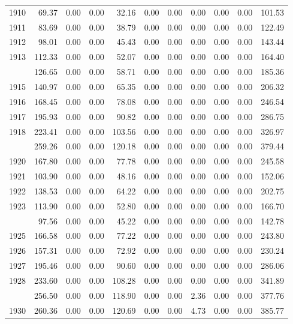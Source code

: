 \begin{longtable}[t]{rrrrrrrrrrr}
1910 & 69.37 & 0.00 & 0.00 & 32.16 & 0.00 & 0.00 & 0.00 & 0.00 & 0.00 & 101.53\\
1911 & 83.69 & 0.00 & 0.00 & 38.79 & 0.00 & 0.00 & 0.00 & 0.00 & 0.00 & 122.49\\
1912 & 98.01 & 0.00 & 0.00 & 45.43 & 0.00 & 0.00 & 0.00 & 0.00 & 0.00 & 143.44\\
1913 & 112.33 & 0.00 & 0.00 & 52.07 & 0.00 & 0.00 & 0.00 & 0.00 & 0.00 & 164.40\\
\addlinespace
1914 & 126.65 & 0.00 & 0.00 & 58.71 & 0.00 & 0.00 & 0.00 & 0.00 & 0.00 & 185.36\\
1915 & 140.97 & 0.00 & 0.00 & 65.35 & 0.00 & 0.00 & 0.00 & 0.00 & 0.00 & 206.32\\
1916 & 168.45 & 0.00 & 0.00 & 78.08 & 0.00 & 0.00 & 0.00 & 0.00 & 0.00 & 246.54\\
1917 & 195.93 & 0.00 & 0.00 & 90.82 & 0.00 & 0.00 & 0.00 & 0.00 & 0.00 & 286.75\\
1918 & 223.41 & 0.00 & 0.00 & 103.56 & 0.00 & 0.00 & 0.00 & 0.00 & 0.00 & 326.97\\
\addlinespace
1919 & 259.26 & 0.00 & 0.00 & 120.18 & 0.00 & 0.00 & 0.00 & 0.00 & 0.00 & 379.44\\
1920 & 167.80 & 0.00 & 0.00 & 77.78 & 0.00 & 0.00 & 0.00 & 0.00 & 0.00 & 245.58\\
1921 & 103.90 & 0.00 & 0.00 & 48.16 & 0.00 & 0.00 & 0.00 & 0.00 & 0.00 & 152.06\\
1922 & 138.53 & 0.00 & 0.00 & 64.22 & 0.00 & 0.00 & 0.00 & 0.00 & 0.00 & 202.75\\
1923 & 113.90 & 0.00 & 0.00 & 52.80 & 0.00 & 0.00 & 0.00 & 0.00 & 0.00 & 166.70\\
\addlinespace
1924 & 97.56 & 0.00 & 0.00 & 45.22 & 0.00 & 0.00 & 0.00 & 0.00 & 0.00 & 142.78\\
1925 & 166.58 & 0.00 & 0.00 & 77.22 & 0.00 & 0.00 & 0.00 & 0.00 & 0.00 & 243.80\\
1926 & 157.31 & 0.00 & 0.00 & 72.92 & 0.00 & 0.00 & 0.00 & 0.00 & 0.00 & 230.24\\
1927 & 195.46 & 0.00 & 0.00 & 90.60 & 0.00 & 0.00 & 0.00 & 0.00 & 0.00 & 286.06\\
1928 & 233.60 & 0.00 & 0.00 & 108.28 & 0.00 & 0.00 & 0.00 & 0.00 & 0.00 & 341.89\\
\addlinespace
1929 & 256.50 & 0.00 & 0.00 & 118.90 & 0.00 & 0.00 & 2.36 & 0.00 & 0.00 & 377.76\\
1930 & 260.36 & 0.00 & 0.00 & 120.69 & 0.00 & 0.00 & 4.73 & 0.00 & 0.00 & 385.77\\

\end{longtable}
